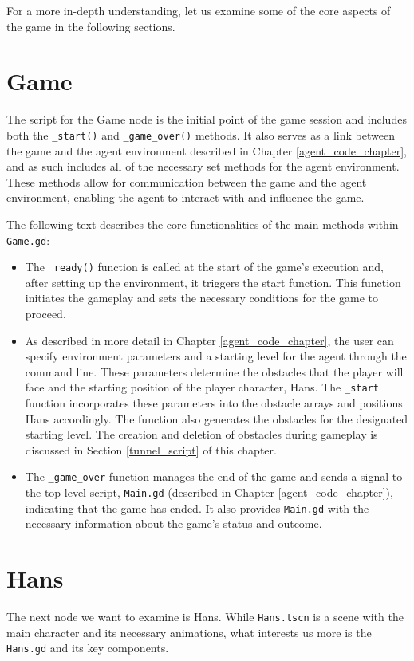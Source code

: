 For a more in-depth understanding, let us examine some of the core aspects of the game in the following sections.

\section{Game}
The script for the Game node is the initial point of the game session and includes both the \texttt{\_start()} and \texttt{\_game\_over()} methods. It also serves as a link between the game and the agent environment described in Chapter \ref{agent_code_chapter}, and as such includes all of the necessary set methods for the agent environment. These methods allow for communication between the game and the agent environment, enabling the agent to interact with and influence the game.

The following text describes the core functionalities of the main methods within \texttt{Game.gd}:
\begin{itemize}
\item The \texttt{\_ready()} function is called at the start of the game's execution and, after setting up the environment, it triggers the start function. This function initiates the gameplay and sets the necessary conditions for the game to proceed.
\item As described in more detail in Chapter \ref{agent_code_chapter}, the user can specify environment parameters and a starting level for the agent through the command line. These parameters determine the obstacles that the player will face and the starting position of the player character, Hans. The \texttt{\_start} function incorporates these parameters into the obstacle arrays and positions Hans accordingly. The function also generates the obstacles for the designated starting level. The creation and deletion of obstacles during gameplay is discussed in Section \ref{tunnel_script} of this chapter.
\item The \texttt{\_game\_over} function manages the end of the game and sends a signal to the top-level script, \texttt{Main.gd} (described in Chapter \ref{agent_code_chapter}), indicating that the game has ended. It also provides \texttt{Main.gd} with the necessary information about the game's status and outcome.
\end{itemize}

\section{Hans}
The next node we want to examine is Hans. While \texttt{Hans.tscn} is a scene with the main character and its necessary animations, what interests us more is the \texttt{Hans.gd} and its key components.

